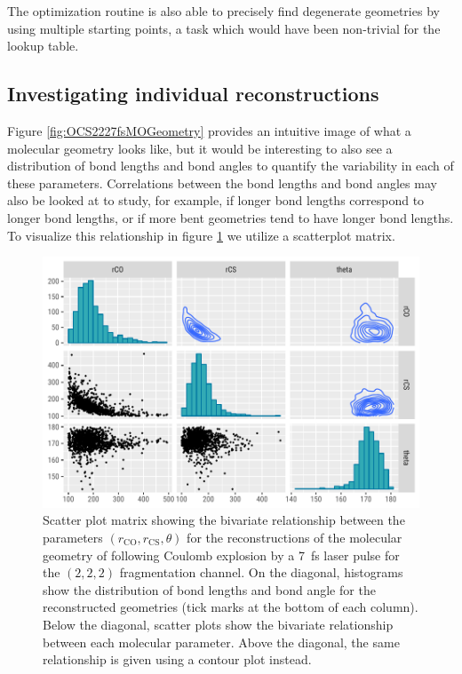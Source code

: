 The optimization routine is also able to precisely find degenerate geometries by using multiple starting points, a task which would have been non-trivial for the lookup table.

\subsection{Investigating individual reconstructions}
Figure \ref{fig:OCS2227fsMOGeometry} provides an intuitive image of what a molecular geometry looks like, but it would be interesting to also see a distribution of bond lengths and bond angles to quantify the variability in each of these parameters. Correlations between the bond lengths and bond angles may also be looked at to study, for example, if longer  bond lengths correspond to longer  bond lengths, or if more bent geometries tend to have longer bond lengths. To visualize this relationship in figure \ref{fig:OCS2227fsMOGeometryPairs} we utilize a scatterplot matrix.

\begin{figure}
  \centering
  \includegraphics[width=\textwidth]{Plots/OCS2227fsMOGeometryPairs}
  \caption[Scatter plot matrix showing the bivariate relationship between the parameters $(r_\mathrm{CO}, r_\mathrm{CS}, \theta)$ for the reconstructions of the molecular geometry of  following Coulomb explosion by a \SI{7}{\fs} laser pulse for the $(2,2,2)$ fragmentation channel.]
  {Scatter plot matrix showing the bivariate relationship between the parameters $(r_\mathrm{CO}, r_\mathrm{CS}, \theta)$ for the reconstructions of the molecular geometry of  following Coulomb explosion by a \SI{7}{\fs} laser pulse for the $(2,2,2)$ fragmentation channel. On the diagonal, histograms show the distribution of bond lengths and bond angle for the reconstructed geometries (tick marks at the bottom of each column). Below the diagonal, scatter plots show the bivariate relationship between each molecular parameter. Above the diagonal, the same relationship is given using a contour plot instead.}
  \label{fig:OCS2227fsMOGeometryPairs}
\end{figure}

